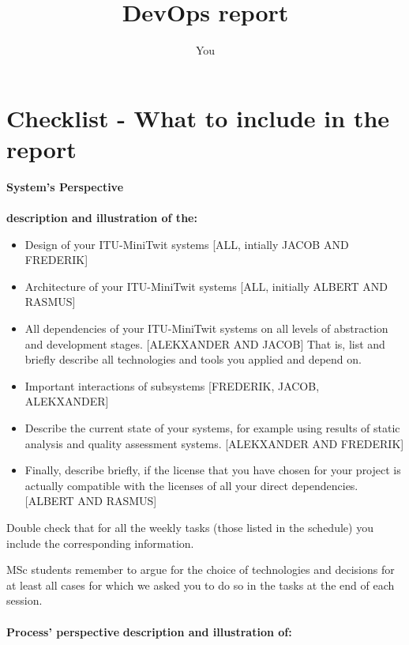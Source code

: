 \documentclass{article}
\title{DevOps report}
\author{You}
\begin{document}
\maketitle

\section{Checklist - What to include in the report}



\textbf{System's Perspective}
\\
\\
\textbf{description and illustration of the:}
\begin{itemize}
\item Design of your ITU-MiniTwit systems [ALL, intially JACOB AND FREDERIK]
\item Architecture of your ITU-MiniTwit systems [ALL, initially ALBERT AND RASMUS]
\item All dependencies of your ITU-MiniTwit systems on all levels of abstraction and development stages. [ALEKXANDER AND JACOB]
\subitem That is, list and briefly describe all technologies and tools you applied and depend on.
\item Important interactions of subsystems [FREDERIK, JACOB, ALEKXANDER]
\item Describe the current state of your systems, for example using results of static analysis and quality assessment systems. [ALEKXANDER AND FREDERIK]
\item Finally, describe briefly, if the license that you have chosen for your project is actually compatible with the licenses of all your direct dependencies. [ALBERT AND RASMUS]
\end{itemize}
Double check that for all the weekly tasks (those listed in the schedule) you include the corresponding information.

MSc students remember to argue for the choice of technologies and decisions for at least all cases for which we asked you to do so in the tasks at the end of each session.
\\
\\
\textbf{Process' perspective}
\textbf{description and illustration of:}
\end{document}
